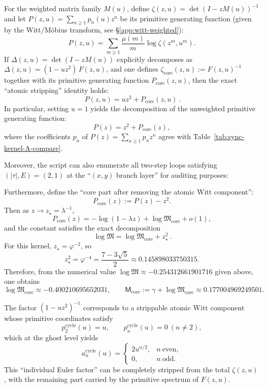 \begin{proposition}\label{prop:atomic-2-orbit-split-logM}
For the weighted matrix family \(M(u)\), define
\(
\zeta(z,u)=\det(I-zM(u))^{-1}
\)
and let \(P(z,u)=\sum_{n\ge 1}p_n(u)z^n\) be its primitive generating function (given by the Witt/M\"obius transform, see \S\ref{app:witt-weighted}):
\[
P(z,u)=\sum_{m\ge 1}\frac{\mu(m)}{m}\log\zeta(z^m,u^m).
\]
If \(\Delta(z,u)=\det(I-zM(u))\) explicitly decomposes as
\(
\Delta(z,u)=(1-uz^2)\,F(z,u)
\), and one defines \(\zeta_{\mathrm{core}}(z,u):=F(z,u)^{-1}\) together with its primitive generating function \(P_{\mathrm{core}}(z,u)\), then the exact ``atomic stripping'' identity holds:
\[
\boxed{\ P(z,u)=u z^2+P_{\mathrm{core}}(z,u)\ }.
\]
In particular, setting \(u=1\) yields the decomposition of the unweighted primitive generating function:
\[
P(z)=z^2+P_{\mathrm{core}}(z),
\]
where the coefficients \(p_n\) of \(P(z)=\sum_{n\ge 1}p_n z^n\) agree with Table~\ref{tab:sync-kernel-A-compare}.

Moreover, the script can also enumerate all two-step loops satisfying \((|\tau|,E)=(2,1)\) at the ``\((x,y)\) branch layer'' for auditing purposes:



Furthermore, define the ``core part after removing the atomic Witt component'':
\[
P_{\mathrm{core}}(z):=P(z)-z^2.
\]
Then as $z\to z_\star=\lambda^{-1}$,
\[
P_{\mathrm{core}}(z)=-\log(1-\lambda z)+\log\mathfrak{M}_{\mathrm{core}}+o(1),
\]
and the constant satisfies the exact decomposition
\[
\boxed{\ \log\mathfrak{M}=\log\mathfrak{M}_{\mathrm{core}}+z_\star^2\ }.
\]
For this kernel, $z_\star=\varphi^{-2}$, so
\[
z_\star^2=\varphi^{-4}=\frac{7-3\sqrt5}{2}\approx 0.145898033750315.
\]
Therefore, from the numerical value $\log\mathfrak{M}\approx -0.254312661901716$ given above, one obtains
\[
\log\mathfrak{M}_{\mathrm{core}}\approx -0.400210695652031,
\qquad
\mathsf{M}_{\mathrm{core}}:=\gamma+\log\mathfrak{M}_{\mathrm{core}}\approx 0.177004969249501.
\]
\end{proposition}

\begin{remark}\label{rem:real-input-40-single-euler}
The factor $(1-uz^2)^{-1}$ corresponds to a strippable atomic Witt component whose primitive coordinates satisfy
\[
p^{\mathrm{cycle}}_2(u)=u,\qquad p^{\mathrm{cycle}}_n(u)=0\ (n\neq 2),
\]
which at the ghost level yields
\[
a^{\mathrm{cycle}}_n(u)=
\begin{cases}
2u^{n/2},& n\ \text{even},\\
0,& n\ \text{odd}.
\end{cases}
\]
This ``individual Euler factor'' can be completely stripped from the total $\zeta(z,u)$, with the remaining part carried by the primitive spectrum of $F(z,u)$.
\end{remark}

